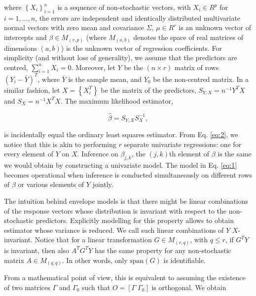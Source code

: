 \documentclass[graybox]{svmult}
\begin{document}
where $\left\{X_i\right\}_{i = 1}^n$ is a sequence of non-stochastic
vectors, with $X_i \in R^p$ for $i = 1, \dots, n$, the errors are
independent and identically distributed multivariate normal vectors
with zero mean and covariance $\Sigma$, $\mu \in R^r$ is an unknown
vector of intercepts and $\beta \in M_{\left( r, p \right)}$ (where
$M_{\left( a, b \right)}$ denotes the space of real matrices of dimensions
$\left( a, b \right)$) is the unknown vector of regression
coefficients.  For simplicity (and without loss of generality), we
assume that the predictors are centred, $\sum_{i = 1}^n X_i =
0$. Moreover, let $Y$ be the $\left( n \times r \right)$ matrix of
rows $\left(Y_i - \bar{Y}\right)^T$, where $\bar{Y}$ is the sample
mean, and $Y_0$ be the non-centred matrix. In a similar fashion, let
$X = \left\{X_i^T\right\}$ be the matrix of the predictors,
$S_{Y, X} = n^{-1} Y^TX$ and $S_X = n^{-1}X^TX$. The maximum
likelihood estimator,

\begin{equation}
  \label{eq:2}
  \hat{\beta} = S_{Y, X}S_X^{-1},
\end{equation}

is incidentally equal the ordinary least squares estimator. From Eq.
\ref{eq:2}, we notice that this is akin to performing $r$ separate
univariate regressions: one for every element of $Y$ on $X$. Inference
on $\beta_{j,k}$, the $\left( j, k \right)$th element of $\beta$ is
the same we would obtain by constructing a univariate model. The model
in Eq. \ref{eq:1} becomes operational when inference is conducted
simultaneously on different rows of $\beta$ or various elements of $Y$
jointly.

The intuition behind envelope models is that there might be linear
combinations of the response vectors whose distribution is invariant
with respect to the non-stochastic predictors. Explicitly modelling
for this property allows to obtain estimator whose variance is
reduced. We call such linear combinations of $Y$ $X$-invariant. Notice
that for a linear transformation $G \in M_{\left( r, q \right)}$, with
$q \leq r$, if $G^T Y$ is invariant, then also $A^T G^T Y$ has the
same property for any non-stochastic matrix
$A \in M_{\left( q, q \right)}$. In other words, only
$\mathrm{span}\left( G \right)$ is identifiable.

From a mathematical point of view, this is equivalent to assuming the
existence of two matrices $\Gamma$ and $\Gamma_0$ such that
$O = \left[ \Gamma \;  \Gamma_0 \right]$ is orthogonal. We obtain
\end{document}
